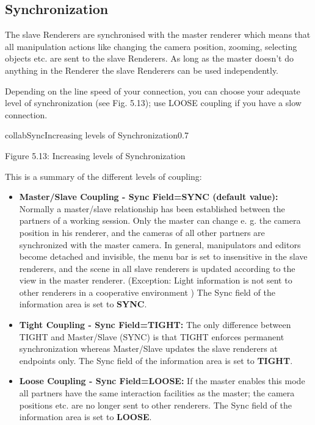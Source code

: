 \subsection{Synchronization}

The slave Renderers are synchronised with the master renderer which means that all 
manipulation actions like changing the camera position, zooming, selecting objects 
etc. are sent to the slave Renderers. As long as the master doesn't do anything in 
the Renderer the slave Renderers can be used independently. 

Depending on the line speed of your connection, you can choose your adequate level of synchronization (see Fig.
5.13); use
LOOSE coupling if you have a slow connection.
  
\begin{covimg}{collab}{Sync}{Increasing levels of Synchronization}{0.7}\end{covimg}
\begin{htmlonly}
Figure 5.13: Increasing levels of Synchronization 
\vspace{0.5cm}
\end{htmlonly}

This is a summary of the different levels of coupling: 
\begin{itemize}
\item {\bf Master/Slave Coupling - Sync Field=SYNC (default value):}
Normally a master/slave relationship has been established between the partners of a working session. 
Only the master can change e. g. the camera position in his renderer, and the cameras of all other 
partners are synchronized with the master camera. In general, manipulators and editors become 
detached and invisible, the menu bar is set to insensitive in the slave renderers, and the scene in 
all slave renderers is updated according to the view in the master renderer. 
(Exception: Light information is not sent to other renderers in a cooperative environment ) 
The Sync field of the information area is set to {\bf SYNC}.
\item {\bf Tight Coupling - Sync Field=TIGHT:}
The only difference between TIGHT and Master/Slave (SYNC) is that 
TIGHT enforces permanent synchronization whereas Master/Slave updates the slave renderers at 
endpoints only.
The Sync field of the information area is set to {\bf TIGHT}.
\item {\bf Loose Coupling - Sync Field=LOOSE:}
If the master enables this mode all partners have the same interaction facilities as the master; 
the camera positions etc. are no longer sent to other renderers. The Sync field of the information 
area is set to {\bf LOOSE}.
\end{itemize}
\clearpage

